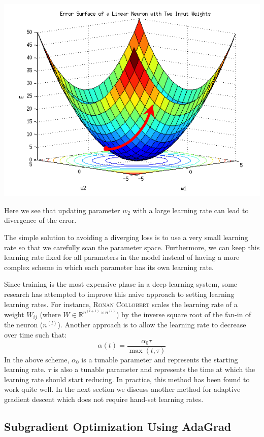 \documentclass{tufte-handout}
\begin{document}
\begin{marginfigure}%
  \includegraphics[width=\linewidth]{Error_Surf}
  \caption{Here we see that updating parameter $w_2$ with a large learning rate can lead to divergence of the error.}
  \label{fig:ErrorSurf}
\end{marginfigure}

The simple solution to avoiding a diverging loss is to use a very small learning rate so that we carefully scan the parameter space. Furthermore, we can keep this learning rate fixed for all parameters in the model instead of having a more complex scheme in which each parameter has its own learning rate.

Since training is the most expensive phase in a deep learning system, some research has attempted to improve this naive approach to setting learning learning rates. For instance, \textsc{Ronan Collobert} scales the learning rate of a weight $W_{ij}$  (where $W \in \mathbb{R}^{n^{(l+1)}\times n^{(l)}}$) by the inverse square root of the fan-in of the neuron ($n^{(l)}$). Another approach is to allow the learning rate to decrease over time such that:
$$ \alpha(t) = \frac{\alpha_0\tau}{\max(t, \tau)}$$
In the above scheme, $\alpha_0$ is a tunable parameter and represents the starting learning rate. $\tau$ is also a tunable parameter and represents the time at which the learning rate should start reducing. In practice, this method has been found to work quite well. In the next section we discuss another method for adaptive gradient descent which does not require hand-set learning rates.

\subsection{Subgradient Optimization Using AdaGrad}
\end{document}
